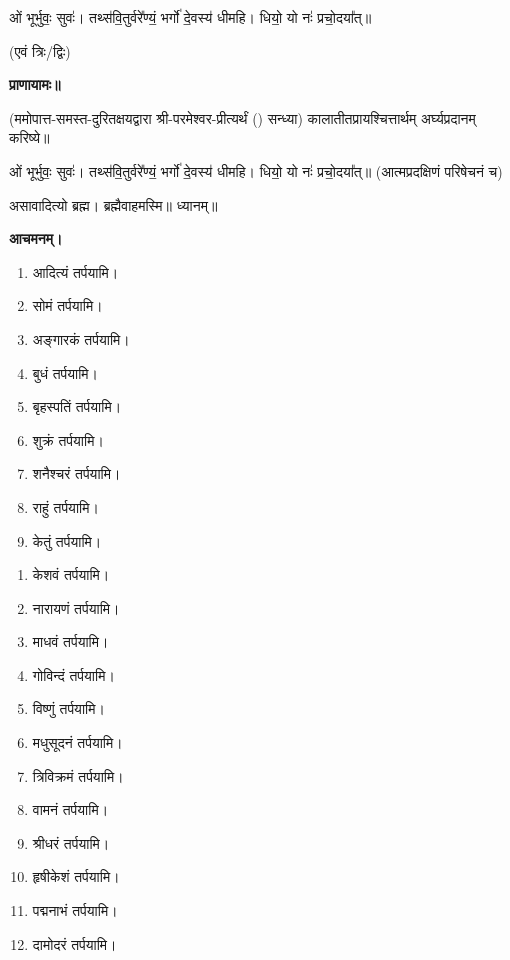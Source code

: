 
ओं भूर्भुवः॒ सुवः॑। तथ्स॑वि॒तुर्वरे᳚ण्यं॒ भर्गो॑ दे॒वस्य॑ धीमहि। धियो॒ यो नः॑ प्रचो॒दया᳚त्॥

\hfill{(एवं त्रिः/द्विः)}


\textbf{प्राणायामः॥}

(ममोपात्त-समस्त-दुरितक्षयद्वारा श्री-परमेश्वर-प्रीत्यर्थं () सन्ध्या)
कालातीतप्रायश्चित्तार्थम् अर्घ्यप्रदानम् करिष्ये॥

ओं भूर्भुवः॒ सुवः॑। तथ्स॑वि॒तुर्वरे᳚ण्यं॒ भर्गो॑ दे॒वस्य॑ धीमहि। धियो॒ यो नः॑ प्रचो॒दया᳚त्॥
\nopagebreak[4]
(आत्मप्रदक्षिणं परिषेचनं च)


असावादित्यो ब्रह्म। ब्रह्मैवाहमस्मि॥ ध्यानम्॥

\textbf{आचमनम्।}



\begin{multicols}{2}
\begin{enumerate}
 \item आदित्यं तर्पयामि।
 \item सोमं तर्पयामि।
 \item अङ्गारकं तर्पयामि।
 \item बुधं तर्पयामि।
 \item बृहस्पतिं तर्पयामि।
 \item शुक्रं तर्पयामि।
 \item शनैश्चरं तर्पयामि।
 \item राहुं तर्पयामि।
 \item केतुं तर्पयामि।
\end{enumerate}
\end{multicols}


\begin{multicols}{2}
\begin{enumerate}
\item केशवं तर्पयामि।
\item नारायणं तर्पयामि।
\item माधवं तर्पयामि।
\item गोविन्दं तर्पयामि।
\item विष्णुं तर्पयामि।
\item मधुसूदनं तर्पयामि।
\item त्रिविक्रमं तर्पयामि।
\item वामनं तर्पयामि।
\item श्रीधरं तर्पयामि।
\item हृषीकेशं तर्पयामि।
\item पद्मनाभं तर्पयामि।
\item दामोदरं तर्पयामि।
\end{enumerate}
\end{multicols}

